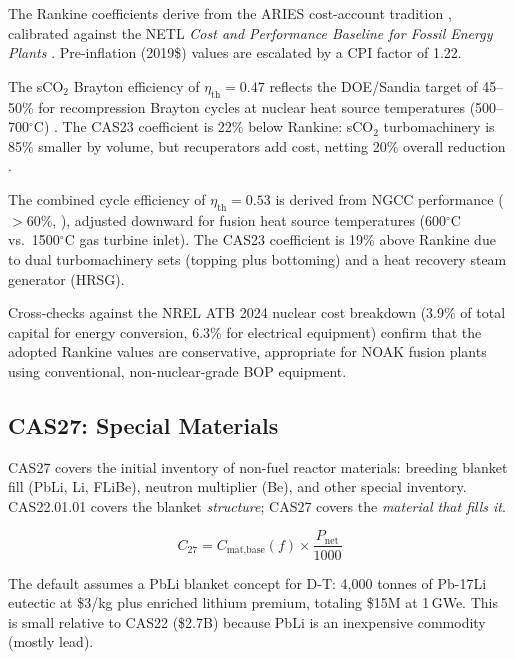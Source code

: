 \documentclass{article}
\begin{document}
The Rankine coefficients derive from the ARIES cost-account tradition
\citep{waganer2013}, calibrated against the NETL \textit{Cost and
Performance Baseline for Fossil Energy Plants} \citep{netl2022}.  Pre-inflation
(2019\$) values are escalated by a CPI factor of 1.22.

The sCO$_2$ Brayton efficiency of $\eta_{\text{th}} = 0.47$ reflects the
DOE/Sandia target of 45--50\% for recompression Brayton cycles at nuclear
heat source temperatures (500--700$^\circ$C)
\citep{doe_qtr2015_sco2,sandia_aec}.  The CAS23 coefficient is 22\% below
Rankine: sCO$_2$ turbomachinery is 85\% smaller by volume, but
recuperators add cost, netting 20\% overall reduction
\citep{ncepu_sco2_comparison}.

The combined cycle efficiency of $\eta_{\text{th}} = 0.53$ is derived from
NGCC performance ($>$60\%, \citealt{netl2022}), adjusted downward for fusion
heat source temperatures (600$^\circ$C vs.\ 1500$^\circ$C gas
turbine inlet).  The CAS23 coefficient is 19\% above Rankine due to dual
turbomachinery sets (topping plus bottoming) and a heat recovery steam generator (HRSG).

Cross-checks against the NREL ATB 2024 nuclear cost breakdown
\citep{nrel_atb2024} (3.9\% of total capital for energy conversion,
6.3\% for electrical equipment) confirm
that the adopted Rankine values are conservative, appropriate for NOAK fusion plants
using conventional, non-nuclear-grade BOP equipment.


\subsection{CAS27: Special Materials}
\label{sec:cas27}

CAS27 covers the initial inventory of non-fuel reactor materials:
breeding blanket fill (PbLi, Li, FLiBe), neutron multiplier (Be), and
other special inventory.  CAS22.01.01 covers the blanket \textit{structure};
CAS27 covers the \textit{material that fills it}.

\begin{equation}
\label{eq:cas27}
C_{27} = C_{\text{mat,base}}(f) \times \frac{P_{\text{net}}}{1000}
\end{equation}

The default assumes a PbLi blanket concept for D-T: 4{,}000 tonnes
of Pb-17Li eutectic at \$3/kg plus enriched lithium premium,
totaling \$15M at 1\,GWe.  This is small relative to CAS22
(\$2.7B) because PbLi is an inexpensive commodity (mostly lead).
\end{document}
